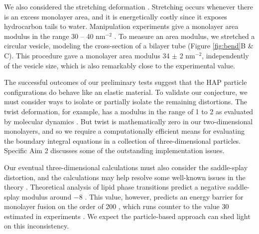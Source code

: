 We also considered the stretching deformation \cite{Fu19}. 
Stretching occurs whenever there is an excess monolayer area,
and it is energetically costly since it exposes hydrocarbon tails to water. 
Manipulation experiments give a monolayer area modulus in the range 
30 -- 40 \kBT\; nm$^{-2}$ \cite{Nagle17, Nagle17-2}. 
To measure an area modulus, we stretched a circular vesicle, modeling the cross-section 
of a bilayer tube (Figure \ref{fig:bend}B \& C).
This procedure gave a monolayer area modulus 
34 $\pm$ 2 \kBT \;nm$^{-2}$, independently of the vesicle size, which
is also remarkably close to the experimental value.  

The successful outcomes of our preliminary tests suggest that the HAP particle configurations 
do behave like an elastic material. To validate our conjecture, we must consider 
ways to isolate or partially isolate the remaining distortions. 
The twist deformation, for example, has a modulus in the range of 1 to 2 \kBT\; 
as evaluated by molecular dynamics \cite{LeVeWa14}. 
But twist is mathematically zero in our two-dimensional monolayers,
and so we require a computationally efficient means for evaluating the 
boundary integral equations in a collection of three-dimensional particles. 
Specific Aim 2 discusses some of the outstanding implementation issues. 


Our eventual three-dimensional calculations must also consider the saddle-splay distortion,
and the calculations may help resolve some well-known issues in the theory \cite{TerziDeserno17}. 
Theoretical analysis of lipid phase transitions predict a negative saddle-splay modulus around $-8$ \kBT\;
\cite{SIEGEL2004366,SIEGEL20085200}.
This value, however, 
predicts an energy barrier for monolayer fusion on the order of 200  \kBT, which runs counter to 
the value 30 \kBT\; estimated in experiments \cite{RyKlYaCo16,FrRoPi17,Tran7106}.  
We expect the particle-based approach can shed light on this inconsistency. 



